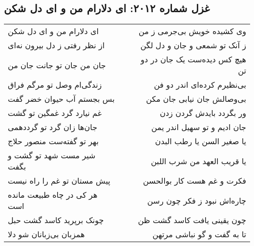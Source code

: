 \begin{center}
\section*{غزل شماره ۲۰۱۲: ای دلارام من و ای دل شکن}
\label{sec:2012}
\begin{longtable}{l p{0.5cm} r}
ای دلارام من و ای دل شکن
&&
وی کشیده خویش بی‌جرمی ز من
\\
از نظر رفتی ز دل بیرون نه‌ای
&&
ز آنک تو شمعی و جان و دل لگن
\\
جان من جان تو جانت جان من
&&
هیچ کس دیده‌ست یک جان در دو تن
\\
زندگی‌ام وصل تو مرگم فراق
&&
بی‌نظیرم کرده‌ای اندر دو فن
\\
بس بجستم آب حیوان خضر گفت
&&
بی‌وصالش جان نیابی جان مکن
\\
غم نیارد گرد غمگین تو گشت
&&
ور بگردد بایدش گردن زدن
\\
جان‌ها زان گرد تو گرددهمی
&&
جان ادیم و تو سهیل اندر یمن
\\
بهر تو گفته‌ست منصور حلاج
&&
یا صغیر السن یا رطب البدن
\\
شیر مست شهد تو گشت و بگفت
&&
یا قریب العهد من شرب اللبن
\\
پیش مستان تو غم را راه نیست
&&
فکرت و غم هست کار بوالحسن
\\
هر کی در چاه طبیعت مانده است
&&
چاره‌اش نبود ز فکر چون رسن
\\
چونک برپرید کاسد گشت حبل
&&
چون یقینی یافت کاسد گشت ظن
\\
همزبان بی‌زبانان شو دلا
&&
تا به گفت و گو نباشی مرتهن
\\
\end{longtable}
\end{center}
